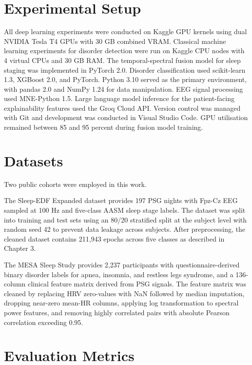 
\section{Experimental Setup}

All deep learning experiments were conducted on Kaggle GPU kernels using dual NVIDIA Tesla T4 GPUs with 30 GB combined VRAM. Classical machine learning experiments for disorder detection were run on Kaggle CPU nodes with 4 virtual CPUs and 30 GB RAM. The temporal-spectral fusion model for sleep staging was implemented in PyTorch 2.0. Disorder classification used scikit-learn 1.3, XGBoost 2.0, and PyTorch. Python 3.10 served as the primary environment, with pandas 2.0 and NumPy 1.24 for data manipulation. EEG signal processing used MNE-Python 1.5. Large language model inference for the patient-facing explainability features used the Groq Cloud API. Version control was managed with Git and development was conducted in Visual Studio Code. GPU utilisation remained between 85 and 95 percent during fusion model training.

\section{Datasets}

Two public cohorts were employed in this work.

The Sleep-EDF Expanded dataset \cite{sleepedfx} provides 197 PSG nights with Fpz-Cz EEG sampled at 100 Hz and five-class AASM sleep stage labels. The dataset was split into training and test sets using an 80/20 stratified split at the subject level with random seed 42 to prevent data leakage across subjects. After preprocessing, the cleaned dataset contains 211,943 epochs across five classes as described in Chapter 3.

The MESA Sleep Study \cite{mesa2020} provides 2,237 participants with questionnaire-derived binary disorder labels for apnea, insomnia, and restless legs syndrome, and a 136-column clinical feature matrix derived from PSG signals. The feature matrix was cleaned by replacing HRV zero-values with NaN followed by median imputation, dropping near-zero mean-HR columns, applying log transformation to spectral power features, and removing highly correlated pairs with absolute Pearson correlation exceeding 0.95.

\section{Evaluation Metrics}

